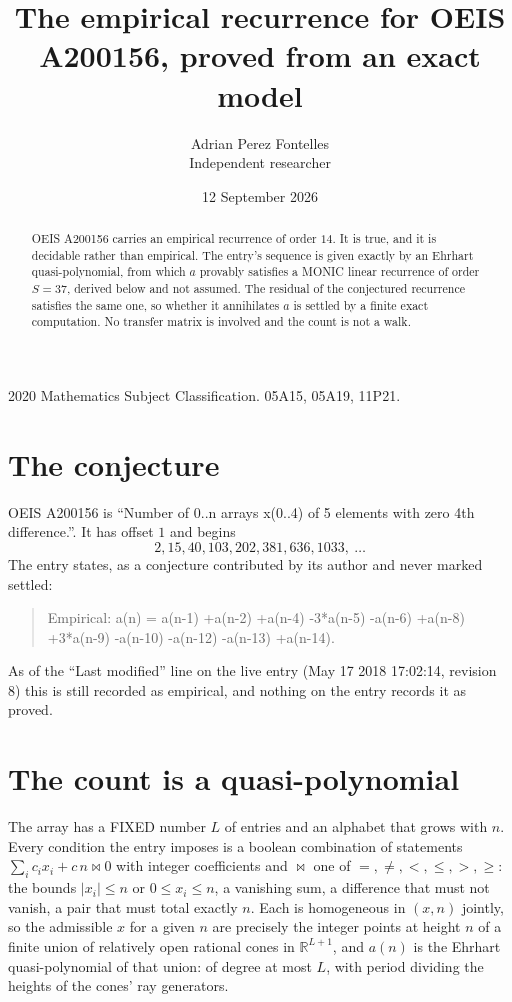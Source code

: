 \documentclass[11pt,a4paper]{article}
\title{The empirical recurrence for OEIS A200156, proved from an exact model}
\author{Adrian Perez Fontelles\\ \small Independent researcher}
\date{12 September 2026}
\theoremstyle{plain}
\theoremstyle{definition}
\begin{document}
\maketitle

\begin{abstract}
OEIS A200156 carries an empirical recurrence of order $14$. It is true, and it is
decidable rather than empirical. The entry's sequence is given exactly by an Ehrhart quasi-polynomial, from
which $a$ provably satisfies a MONIC linear recurrence of order $S=37$, derived below and not
assumed. The residual of the conjectured recurrence satisfies the same one, so whether it
annihilates $a$ is settled by a finite exact computation. No transfer matrix is involved and
the count is not a walk.
\end{abstract}

\noindent\small 2020 Mathematics Subject Classification. 05A15, 05A19, 11P21.\normalsize

\section{The conjecture}

OEIS A200156 is ``Number of 0..n arrays x(0..4) of 5 elements with zero 4th difference.''. It has offset $1$ and begins
\[
2, 15, 40, 103, 202, 381, 636, 1033,\ \dots
\]
The entry states, as a conjecture contributed by its author and never marked settled:
\begin{quote}
Empirical: a(n) = a(n-1) +a(n-2) +a(n-4) -3*a(n-5) -a(n-6) +a(n-8) +3*a(n-9) -a(n-10) -a(n-12) -a(n-13) +a(n-14).
\end{quote}
As of the ``Last modified'' line on the live entry (May 17 2018 17:02:14, revision 8)
this is still recorded as empirical, and nothing on the entry records it as proved.

\section{The count is a quasi-polynomial}

The array has a FIXED number $L$ of entries and an alphabet that grows with $n$. Every
condition the entry imposes is a boolean combination of statements
$\sum_i c_ix_i + c\,n \bowtie 0$ with integer coefficients and $\bowtie$ one of
$=,\ne,<,\le,>,\ge$: the bounds $|x_i|\le n$ or $0\le x_i\le n$, a vanishing sum, a difference
that must not vanish, a pair that must total exactly $n$. Each is homogeneous in $(x,n)$
jointly, so the admissible $x$ for a given $n$ are precisely the integer points at height $n$
of a finite union of relatively open rational cones in $\mathbb{R}^{L+1}$, and $a(n)$ is
the Ehrhart quasi-polynomial of that union: of degree at most $L$, with period dividing the
heights of the cones' ray generators.
\end{document}
